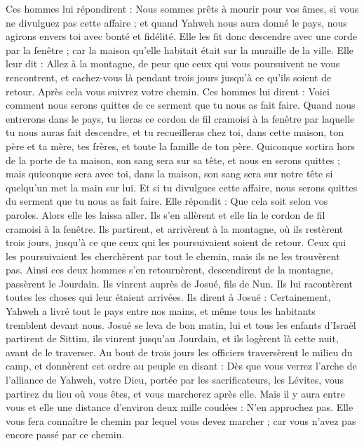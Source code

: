 \begin{multicols}{2}
Ces hommes lui répondirent : Nous sommes prêts à mourir pour vos âmes, si vous ne divulguez pas cette affaire ; et quand Yahweh nous aura donné le pays, nous agirons envers toi avec bonté et fidélité.
Elle les fit donc descendre avec une corde par la fenêtre ; car la maison qu’elle habitait était sur la muraille de la ville.
Elle leur dit : Allez à la montagne, de peur que ceux qui vous poursuivent ne vous rencontrent, et cachez-vous là pendant trois jours jusqu’à ce qu’ils soient de retour. Après cela vous suivrez votre chemin.
Ces hommes lui dirent : Voici comment nous serons quittes de ce serment que tu nous as fait faire.
Quand nous entrerons dans le pays, tu lieras ce\FTNT{} cordon de fil cramoisi à la fenêtre par laquelle tu nous auras fait descendre, et tu recueilleras chez toi, dans cette maison, ton père et ta mère, tes frères, et toute la famille de ton père.
Quiconque sortira hors de la porte de ta maison, son sang sera sur sa tête, et nous en serons quittes ; mais quiconque sera avec toi, dans la maison, son sang sera sur notre tête si quelqu’un met la main sur lui.
Et si tu divulgues cette affaire, nous serons quittes du serment que tu nous as fait faire.
Elle répondit : Que cela soit selon vos paroles. Alors elle les laissa aller. Ils s’en allèrent et elle lia le cordon de fil cramoisi à la fenêtre.
Ils partirent, et arrivèrent à la montagne, où ils restèrent trois jours, jusqu’à ce que ceux qui les poursuivaient soient de retour. Ceux qui les poursuivaient les cherchèrent par tout le chemin, mais ils ne les trouvèrent pas.
Ainsi ces deux hommes s’en retournèrent, descendirent de la montagne, passèrent le Jourdain. Ils vinrent auprès de Josué, fils de Nun. Ils lui racontèrent toutes les choses qui leur étaient arrivées.
Ils dirent à Josué : Certainement, Yahweh a livré tout le pays entre nos mains, et même tous les habitants tremblent devant nous.
\VerseOne{}Josué se leva de bon matin, lui et tous les enfants d’Israël partirent de Sittim, ils vinrent jusqu’au Jourdain, et ils logèrent là cette nuit, avant de le traverser.
Au bout de trois jours les officiers traversèrent le milieu du camp,
et donnèrent cet ordre au peuple en disant : Dès que vous verrez l’arche de l’alliance de Yahweh, votre Dieu, portée par les sacrificateurs, les Lévites, vous partirez du lieu où vous êtes, et vous marcherez après elle.
Mais il y aura entre vous et elle une distance d’environ deux mille coudées : N’en approchez pas. Elle vous fera connaître le chemin par lequel vous devez marcher ; car vous n’avez pas encore passé par ce chemin.

\end{multicols}
